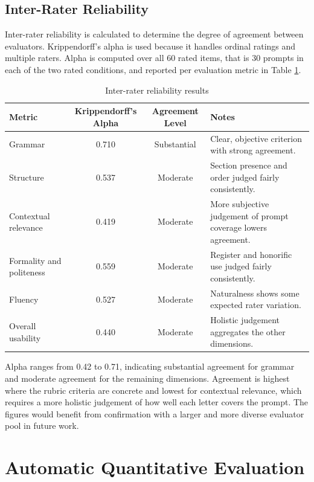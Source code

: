 \documentclass[12pt]{uomthesis}
\begin{document}
\subsection{Inter-Rater Reliability}
\label{sec:irr}

Inter-rater reliability is calculated to determine the degree of agreement between evaluators. Krippendorff's alpha is used because it handles ordinal ratings and multiple raters. Alpha is computed over all 60 rated items, that is 30 prompts in each of the two rated conditions, and reported per evaluation metric in Table \ref{tab:inter_rater_reliability}.

\begin{table}[!htbp]
\centering
\small
\begin{tabularx}{\linewidth}{@{}lccX@{}}
\toprule
\textbf{Metric} & \textbf{Krippendorff's Alpha} & \textbf{Agreement Level} & \textbf{Notes} \\
\midrule
Grammar & 0.710 & Substantial & Clear, objective criterion with strong agreement. \\
Structure & 0.537 & Moderate & Section presence and order judged fairly consistently. \\
Contextual relevance & 0.419 & Moderate & More subjective judgement of prompt coverage lowers agreement. \\
Formality and politeness & 0.559 & Moderate & Register and honorific use judged fairly consistently. \\
Fluency & 0.527 & Moderate & Naturalness shows some expected rater variation. \\
Overall usability & 0.440 & Moderate & Holistic judgement aggregates the other dimensions. \\
\bottomrule
\end{tabularx}
\caption{Inter-rater reliability results}
\label{tab:inter_rater_reliability}
\end{table}

Alpha ranges from 0.42 to 0.71, indicating substantial agreement for grammar and moderate agreement for the remaining dimensions. Agreement is highest where the rubric criteria are concrete and lowest for contextual relevance, which requires a more holistic judgement of how well each letter covers the prompt. The figures would benefit from confirmation with a larger and more diverse evaluator pool in future work.

\section{Automatic Quantitative Evaluation}
\label{sec:automatic_metrics}
\end{document}
